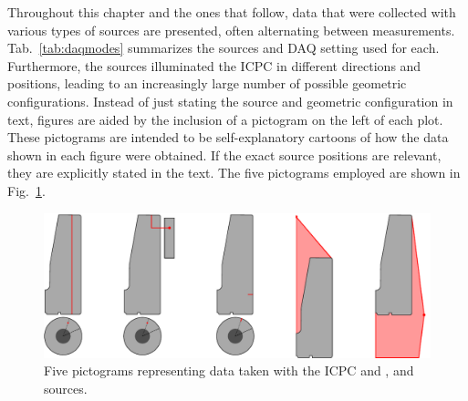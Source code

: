 Throughout this chapter and the ones that follow, data that were collected with various types of sources are presented, often alternating between measurements. Tab.~\ref{tab:daqmodes} summarizes the sources and DAQ setting used for each. Furthermore, the sources illuminated the ICPC in different directions and positions, leading to an increasingly large number of possible geometric configurations. Instead of just stating the source and geometric configuration in text, figures are aided by the inclusion of a pictogram on the left of each plot. These pictograms are intended to be self-explanatory cartoons of how the data shown in each figure were obtained. If the exact source positions are relevant, they are explicitly stated in the text. The five pictograms employed are shown in Fig.~\ref{fig:pictograms}. 
\begin{figure}[htb]
    \centering
    \includegraphics[width=6in]{figs/param/pictograms.pdf}
    \caption{Five pictograms representing data taken with the ICPC and \CsS{}, \BaS{} and \ThS{} sources.}
    \label{fig:pictograms}
\end{figure}


